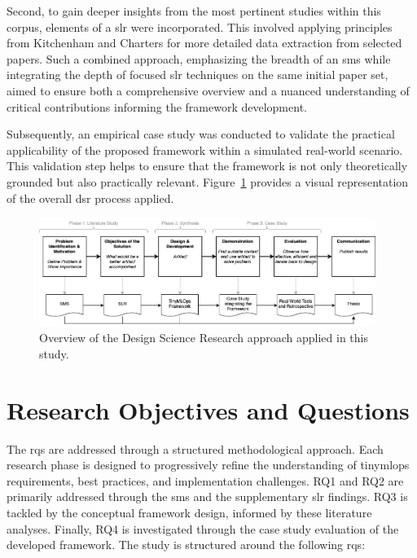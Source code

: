 Second, to gain deeper insights from the most pertinent studies within this corpus, elements of a \gls{slr} were incorporated. This involved applying principles from Kitchenham and Charters \cite{kitchenhamGuidelinesPerformingSystematic2007} for more detailed data extraction from selected papers. Such a combined approach, emphasizing the breadth of an \gls{sms} while integrating the depth of focused \gls{slr} techniques on the same initial paper set, aimed to ensure both a comprehensive overview and a nuanced understanding of critical contributions informing the framework development.

Subsequently, an empirical case study was conducted to validate the practical applicability of the proposed framework within a simulated real-world scenario. This validation step helps to ensure that the framework is not only theoretically grounded but also practically relevant. Figure~\ref{fig:research-methodology} provides a visual representation of the overall \gls{dsr} process applied.

\begin{figure}[htbp]
    \centering
    \includegraphics[width=0.975\textwidth]{figs/research_design/dsr-diagramm.png}
    \caption[Research Methodology Overview]{Overview of the Design Science Research approach applied in this study.}
    \label{fig:research-methodology}
\end{figure}

\section{Research Objectives and Questions}
\label{sec:ResearchObjectivesAndQuestions} 

The \glspl{rq} are addressed through a structured methodological approach. Each research phase is designed to progressively refine the understanding of \gls{tinymlops} requirements, best practices, and implementation challenges. RQ1 and RQ2 are primarily addressed through the \gls{sms} and the supplementary \gls{slr} findings. RQ3 is tackled by the conceptual framework design, informed by these literature analyses. Finally, RQ4 is investigated through the case study evaluation of the developed framework. The study is structured around the following \glspl{rq}:

